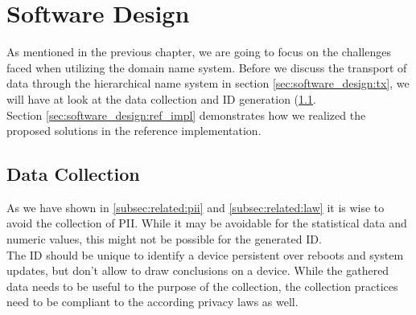 \chapter{Software Design}
\label{chap:software_design}

As mentioned in the previous chapter, we are going to focus on the challenges faced when utilizing the domain name system. Before we discuss the transport of data through the hierarchical name system in section \ref{sec:software_design:tx}, we will have at look at the data collection and ID generation (\ref{sec:software_design:data_collection}.\\
Section \ref{sec:software_design:ref_impl} demonstrates how we realized the proposed solutions in the reference implementation.


%



\section{Data Collection}
\label{sec:software_design:data_collection}
    As we have shown in \ref{subsec:related:pii} and \ref{subsec:related:law} it is wise to avoid the collection of PII. While it may be avoidable for the statistical data and numeric values, this might not be possible for the generated ID.\\
    The ID should be unique to identify a device persistent over reboots and system updates, but don't allow to draw conclusions on a device.
    While the gathered data needs to be useful to the purpose of the collection, the collection practices need to be compliant to the according privacy laws as well. 
    
